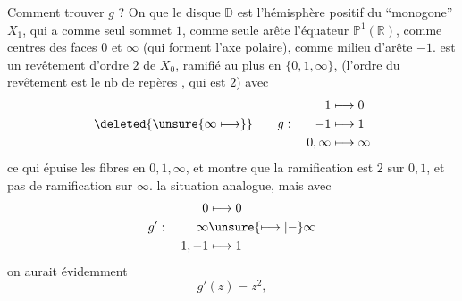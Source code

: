 Comment trouver $g$ ? On  que le disque $\mathbb D$ est l'hémisphère positif du  ``monogone''  $X_1$, qui  a comme seul sommet $1$, comme seule arête l'équateur $\mathbb P^1(\mathbb R)$, comme centres des  faces $0$ et $\infty$ (qui forment l'axe polaire), comme milieu d'arête $-1$.
 est un revêtement d'ordre $2$ de $X_0$, ramifié  au plus en $\{0,1,\infty\}$, (l'ordre du revêtement est le nb de repères , qui est $2$) avec
\[
\deleted{\unsure{\infty\longmapsto}}\qquad
g:\quad\begin{aligned}
1&\longmapsto0\\
-1&\longmapsto1\\
0,\infty&\longmapsto\infty
\end{aligned}
\]
ce qui épuise les fibres en $0,1,\infty$, et montre que la ramification est $2$ sur $0,1$, et pas de ramification sur $\infty$.   la  situation analogue,  mais avec
\[
g':\quad\begin{aligned}
0&\longmapsto0\\
\infty&\unsure{\longmapsto|\mathbin{-}}\infty\\
1,-1&\longmapsto1
\end{aligned}
\]
on aurait évidemment
\[
g'(z)=z^2,
\]
